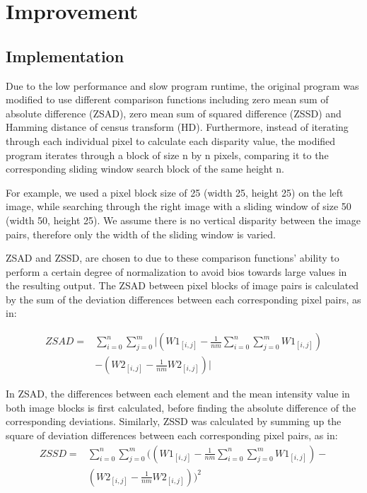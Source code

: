 \documentclass[conference]{IEEEtran}
\begin{document}
\vspace{10pt}
\section{Improvement}
\subsection{Implementation}
Due to the low performance and slow program runtime, the original program was modified to use different comparison functions including zero mean sum of absolute difference (ZSAD), zero mean sum of squared difference (ZSSD) and Hamming distance of census transform (HD). Furthermore, instead of iterating through each individual pixel to calculate each disparity value, the modified program iterates through a block of size n by n pixels, comparing it to the corresponding sliding window search block of the same height n. 

For example, we used a pixel block size of 25 (width 25, height 25) on the left image, while searching through the right image with a sliding window of size 50 (width 50, height 25). We assume there is no vertical disparity between the image pairs, therefore only the width of the sliding window is varied.

ZSAD and ZSSD, are chosen to due to these comparison functions'  ability to perform a certain degree of normalization to avoid bios towards large values in the resulting output. The ZSAD between pixel blocks of image pairs is calculated by the sum of the deviation differences between each corresponding pixel pairs, as in:

\begin{equation*}
    \begin{aligned}
        ZSAD= {} & \sum^{n}_{i=0}\sum^{m}_{j=0}|(W1_{[i,j]}-\frac{1}{nm}\sum^{n}_{i=0}\sum^{m}_{j=0}W1_{[i,j]})\\
        & -(W2_{[i,j]}-\frac{1}{nm}W2_{[i,j]})|
    \end{aligned}
\end{equation*}

In ZSAD, the differences between each element and the mean intensity value in both image blocks is first calculated, before finding the absolute difference of the corresponding deviations. Similarly, ZSSD was calculated by summing up the square of deviation differences between each corresponding pixel pairs, as in:
\begin{equation*}
    \begin{aligned}
        ZSSD= {} & \sum^{n}_{i=0}\sum^{m}_{j=0}((W1_{[i,j]}-\frac{1}{nm}\sum^{n}_{i=0}\sum^{m}_{j=0}W1_{[i,j]})- \\
        & (W2_{[i,j]}-\frac{1}{nm}W2_{[i,j]}))^2
    \end{aligned}
\end{equation*}
\end{document}
